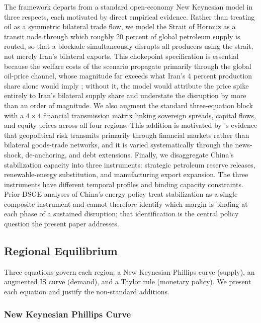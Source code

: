 \documentclass[12pt]{article}
\begin{document}
The framework departs from a standard open-economy New Keynesian model in three respects, each motivated by direct empirical evidence. Rather than treating oil as a symmetric bilateral trade flow, we model the Strait of Hormuz as a transit node through which roughly 20 percent of global petroleum supply is routed, so that a blockade simultaneously disrupts all producers using the strait, not merely Iran's bilateral exports. This chokepoint specification is essential because the welfare costs of the scenario propagate primarily through the global oil-price channel, whose magnitude far exceeds what Iran's 4 percent production share alone would imply \citep{hamilton2009understanding}; without it, the model would attribute the price spike entirely to Iran's bilateral supply share and understate the disruption by more than an order of magnitude. We also augment the standard three-equation block with a $4 \times 4$ financial transmission matrix linking sovereign spreads, capital flows, and equity prices across all four regions. This addition is motivated by \citet{caldara2022measuring}'s evidence that geopolitical risk transmits primarily through financial markets rather than bilateral goods-trade networks, and it is varied systematically through the news-shock, de-anchoring, and debt extensions. Finally, we disaggregate China's stabilization capacity into three instruments: strategic petroleum reserve releases, renewable-energy substitution, and manufacturing export expansion. The three instruments have different temporal profiles and binding capacity constraints. Prior DSGE analyses of China's energy policy \citep{zhang2020china} treat stabilization as a single composite instrument and cannot therefore identify which margin is binding at each phase of a sustained disruption; that identification is the central policy question the present paper addresses.

\subsection{Regional Equilibrium}

Three equations govern each region: a New Keynesian Phillips curve (supply), an augmented IS curve (demand), and a Taylor rule (monetary policy). We present each equation and justify the non-standard additions.

\subsubsection{New Keynesian Phillips Curve}
\end{document}

